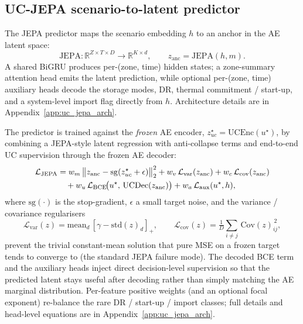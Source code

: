 \documentclass{article}
\begin{document}
\subsection{UC-JEPA scenario-to-latent predictor}
\label{sec:uc_jepa}

The JEPA predictor maps the scenario embedding $h$ to an anchor in the AE latent space:
\begin{equation}
\mathrm{JEPA}: \mathbb{R}^{Z \times T \times D} \longrightarrow \mathbb{R}^{K \times d}, \qquad
z_{\mathrm{anc}} = \mathrm{JEPA}(h, m).
\label{eq:jepa_signature}
\end{equation}
A shared BiGRU produces per-(zone, time) hidden states; a zone-summary attention head emits the latent prediction, while optional per-(zone, time) auxiliary heads decode the storage modes, DR, thermal commitment / start-up, and a system-level import flag directly from $h$. Architecture details are in Appendix~\ref{app:uc_jepa_arch}.

The predictor is trained against the \emph{frozen} AE encoder, $z^\star_{uc} = \mathrm{UCEnc}(u^\star)$, by combining a JEPA-style latent regression with anti-collapse terms and end-to-end UC supervision through the frozen AE decoder:
\begin{align}
\mathcal{L}_{\mathrm{JEPA}}
   &= w_m\, \big\| z_{\mathrm{anc}} - \mathrm{sg}(z^\star_{uc} + \epsilon)\big\|_2^2
   + w_v\, \mathcal{L}_{\mathrm{var}}(z_{\mathrm{anc}})
   + w_c\, \mathcal{L}_{\mathrm{cov}}(z_{\mathrm{anc}}) \notag \\
   &\quad + w_u\, \mathcal{L}_{\mathrm{BCE}}\!\bigl(u^\star,\, \mathrm{UCDec}(z_{\mathrm{anc}})\bigr)
   + w_a\, \mathcal{L}_{\mathrm{aux}}(u^\star, h),
\label{eq:jepa_loss}
\end{align}
where $\mathrm{sg}(\cdot)$ is the stop-gradient, $\epsilon$ a small target noise, and the variance / covariance regularisers
\begin{equation}
\mathcal{L}_{\mathrm{var}}(z) = \mathrm{mean}_d\,[\gamma - \mathrm{std}(z)_d]_+, \qquad
\mathcal{L}_{\mathrm{cov}}(z) = \tfrac{1}{D}\!\sum_{i \neq j}\,\mathrm{Cov}(z)_{ij}^{\,2},
\label{eq:vc_reg}
\end{equation}
prevent the trivial constant-mean solution that pure MSE on a frozen target tends to converge to (the standard JEPA failure mode). The decoded BCE term and the auxiliary heads inject direct decision-level supervision so that the predicted latent stays useful after decoding rather than simply matching the AE marginal distribution. Per-feature positive weights (and an optional focal exponent) re-balance the rare DR / start-up / import classes; full details and head-level equations are in Appendix~\ref{app:uc_jepa_arch}.
\end{document}

